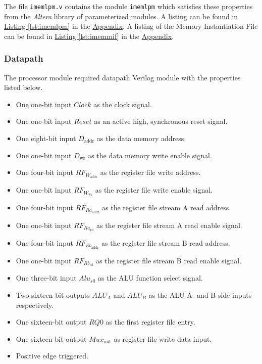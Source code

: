The file \verb|imemlpm.v| contains the module \verb|imemlpm| which satisfies these properties from the \emph{Altera} library of parameterized modules.
A listing can be found in \hyperref[lst:imemlpm]{Listing \ref*{lst:imemlpm}} in the \hyperref[sec:appendix]{Appendix}.
A listing of the Memory Instantiation File can be found in \hyperref[lst:imemmif]{Listing \ref*{lst:imemmif}} in the \hyperref[sec:appendix]{Appendix}.

\subsubsection{Datapath} \label{subsub:datapath}

The processor module required datapath Verilog module with the properties listed below.

\begin{itemize}
    \item One one-bit input $Clock$ as the clock signal.
    \item One one-bit input $Reset$ as an active high, synchronous reset signal.
    \item One eight-bit input $D_\text{addr}$ as the data memory address.
    \item One one-bit input $D_\text{wr}$ as the data memory write enable signal.
    \item One four-bit input $RF_{W_\text{addr}}$ as the register file write address.
    \item One one-bit input $RF_{W_\text{wr}}$ as the register file write enable signal.
    \item One four-bit input $RF_{Ra_\text{addr}}$ as the register file stream A read address.
    \item One one-bit input $RF_{Ra_\text{rd}}$ as the register file stream A read enable signal.
    \item One four-bit input $RF_{Rb_\text{addr}}$ as the register file stream B read address.
    \item One one-bit input $RF_{Rb_\text{rd}}$ as the register file stream B read enable signal.
    \item One three-bit input $Alu_{s0}$ as the ALU function select signal.
    \item Two sixteen-bit outputs $ALU_A$ and $ALU_B$ as the ALU A- and B-side inputs respectively.
    \item One sixteen-bit output $RQ0$ as the first register file entry.
    \item One sixteen-bit output $Mux_\text{out}$ as register file write data input.
    \item Positive edge triggered.
\end{itemize}


